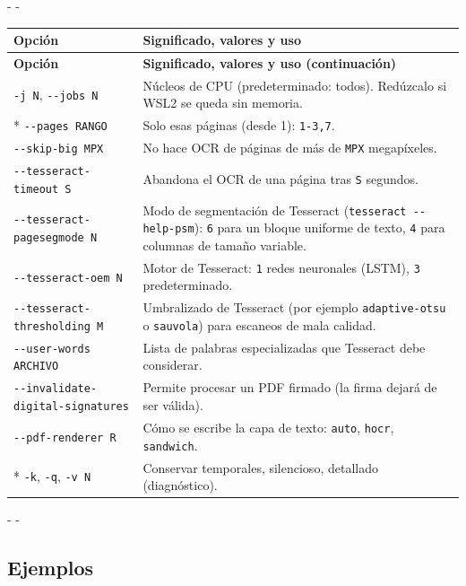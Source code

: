 \documentclass[11pt,a4paper]{article}
\makeatletter
\newcommand{\necesitaespacio}[1]{\par\penalty-100\begingroup
	\setlength{\dimen@}{#1}\dimen@ii\pagegoal\advance\dimen@ii-\pagetotal
	\ifdim\dimen@>\dimen@ii\ifdim\dimen@ii>\z@\vfil\fi\penalty-\@M\fi\endgroup}
\newenvironment{opciones}[1][Opción]{%
	\par\begingroup\small
	\begin{longtable}{L{4.25cm}L{11.2cm}}
		\toprule\rowcolor{tablacab}\cab{#1} & \cab{Significado, valores y uso} \\ \midrule
		\endfirsthead
		\toprule\rowcolor{tablacab}\cab{#1} & \cab{Significado, valores y uso (continuación)} \\ \midrule
		\endhead
		\bottomrule
		\endfoot}
	{\end{longtable}\endgroup}
\newcommand{\cmd}[1]{\texttt{\textcolor{colcmd}{#1}}}      %
\newcommand{\opt}[1]{\texttt{\textcolor{colopt}{#1}}}      %
\newcommand{\val}[1]{\texttt{#1}}                          %
\newcommand{\cab}[1]{\textbf{#1}}
\makeatother
\begin{document}
	\necesitaespacio{30\baselineskip}
	\begin{opciones}
		\opt{-j N}, \opt{-{}-jobs N} & Núcleos de CPU (predeterminado: todos). Redúzcalo si WSL2 se queda sin memoria.\\*
		\opt{-{}-pages RANGO} & Solo esas páginas (desde 1): \val{1-3,7}.\\
		\opt{-{}-skip-big MPX} & No hace OCR de páginas de más de \val{MPX} megapíxeles.\\
		\opt{-{}-tesseract-\allowbreak{}timeout S} & Abandona el OCR de una página tras \val{S} segundos.\\
		\opt{-{}-tesseract-\allowbreak{}pagesegmode N} & Modo de segmentación de Tesseract (\cmd{tesseract -{}-help-\allowbreak{}psm}): \val{6} para un bloque uniforme de texto, \val{4} para columnas de tamaño variable.\\
		\opt{-{}-tesseract-\allowbreak{}oem N} & Motor de Tesseract: \val{1} redes neuronales (LSTM), \val{3} predeterminado.\\
		\opt{-{}-tesseract-\allowbreak{}thresholding M} & Umbralizado de Tesseract (por ejemplo \val{adaptive-otsu} o \val{sauvola}) para escaneos de mala calidad.\\
		\opt{-{}-user-\allowbreak{}words ARCHIVO} & Lista de palabras especializadas que Tesseract debe considerar.\\
		\opt{-{}-invalidate-\allowbreak{}digital-\allowbreak{}signatures} & Permite procesar un PDF firmado (la firma dejará de ser válida).\\
		\opt{-{}-pdf-\allowbreak{}renderer R} & Cómo se escribe la capa de texto: \val{auto}, \val{hocr}, \val{sandwich}.\\*
		\opt{-k}, \opt{-q}, \opt{-v N} & Conservar temporales, silencioso, detallado (diagnóstico).\\
	\end{opciones}
	
	\necesitaespacio{8\baselineskip}
	\subsection{Ejemplos}
	
\end{document}
